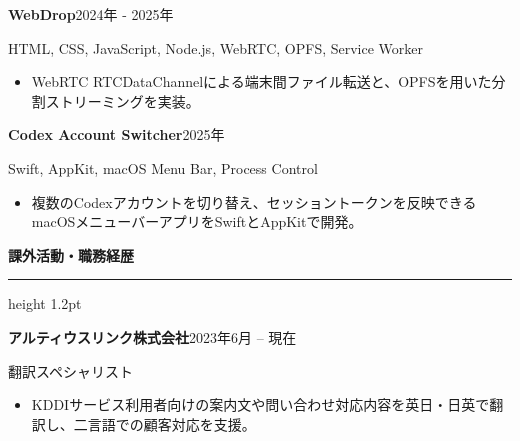 \documentclass[9.5pt, a4paper]{article}
\newcommand{\rightsection}[1]{%
  \vspace{10pt}
  {\fontsize{11.5}{13.5}\selectfont\textcolor{sectioncolor}{\textbf{#1}}}\par
  \vspace{3pt}
  {\color{sectioncolor}\hrule height 1.2pt}\par
  \vspace{6pt}
}
\begin{document}
\begin{minipage}[t][0.96\textheight][t]{0.63\textwidth}
\begin{minipage}[t]{\linewidth}
    \noindent
    \begin{minipage}[t]{\linewidth}
      \textbf{\fontsize{9.5}{11.5}\selectfont WebDrop}\hfill\textcolor{bodycolor}{\fontsize{8}{10}\selectfont 2024年 - 2025年}\par\vspace{2pt}
      \textcolor{bodycolor}{\fontsize{8}{10}\selectfont HTML, CSS, JavaScript, Node.js, WebRTC, OPFS, Service Worker}\par\vspace{2pt}
      \begin{itemize}[leftmargin=1.2em, itemsep=1pt, topsep=1pt, parsep=0pt]
        \fontsize{8.2}{11.5}\selectfont
        \item WebRTC RTCDataChannelによる端末間ファイル転送と、OPFSを用いた分割ストリーミングを実装。
      \end{itemize}
    \end{minipage}
    \vspace{5pt}

    \noindent
    \begin{minipage}[t]{\linewidth}
      \textbf{\fontsize{9.5}{11.5}\selectfont Codex Account Switcher}\hfill\textcolor{bodycolor}{\fontsize{8}{10}\selectfont 2025年}\par\vspace{2pt}
      \textcolor{bodycolor}{\fontsize{8}{10}\selectfont Swift, AppKit, macOS Menu Bar, Process Control}\par\vspace{2pt}
      \begin{itemize}[leftmargin=1.2em, itemsep=1pt, topsep=1pt, parsep=0pt]
        \fontsize{8.2}{11.5}\selectfont
        \item 複数のCodexアカウントを切り替え、セッショントークンを反映できるmacOSメニューバーアプリをSwiftとAppKitで開発。
      \end{itemize}
    \end{minipage}
    \vspace{5pt}
    
    \vspace{6pt}
    \rightsection{課外活動・職務経歴}
    
    \noindent
    \begin{minipage}[t]{\linewidth}
      \textbf{\fontsize{9.5}{11.5}\selectfont アルティウスリンク株式会社}\hfill\textcolor{bodycolor}{\fontsize{8}{10}\selectfont 2023年6月 -- 現在}\par\vspace{2pt}
      \textcolor{bodycolor}{\fontsize{8.5}{11}\selectfont 翻訳スペシャリスト}\par\vspace{2pt}
      \begin{itemize}[leftmargin=1.2em, itemsep=1pt, topsep=1pt, parsep=0pt]
        \fontsize{8.2}{11.5}\selectfont
        \item KDDIサービス利用者向けの案内文や問い合わせ対応内容を英日・日英で翻訳し、二言語での顧客対応を支援。
      \end{itemize}
    \end{minipage}
    \vspace{6pt}


\end{minipage}
\end{minipage}
\end{document}
